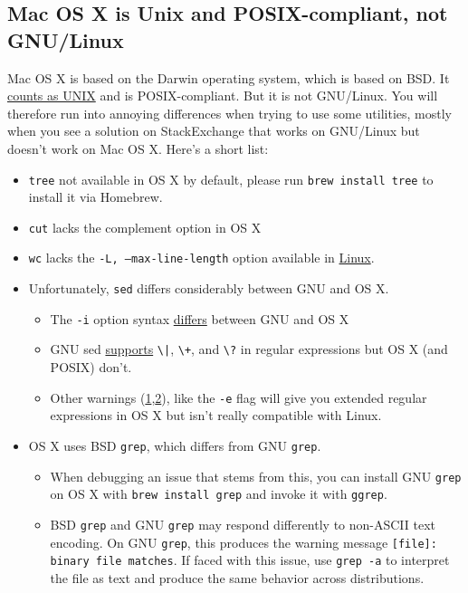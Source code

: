 \subsection{Mac OS X is Unix and POSIX-compliant, not GNU/Linux}

Mac OS X is based on the Darwin operating system, which is based on BSD.
It \href{https://www.opengroup.org/openbrand/register/apple.htm}{counts as UNIX} and is POSIX-compliant.
But it is not GNU/Linux.
You will therefore run into annoying differences when trying to use some utilities, mostly when you see a solution on StackExchange that works on GNU/Linux but doesn't work on Mac OS X.
Here's a short list:
\begin{itemize}
\item \texttt{tree} not available in OS X by default, please run \texttt{brew install tree} to install it via Homebrew.
\item \texttt{cut} lacks the complement option in OS X
\item \texttt{wc} lacks the \texttt{-L, --max-line-length} option available in \href{https://linux.die.net/man/1/wc}{Linux}.
\item Unfortunately, \texttt{sed} differs considerably between GNU and OS X.
\begin{itemize}
	\item The \texttt{-i} option syntax \href{https://stackoverflow.com/questions/2320564/i-need-my-sed-i-command-for-in-place-editing-to-work-with-both-gnu-sed-and-bsd}{differs} between GNU and OS X
	\item GNU sed \href{https://unix.stackexchange.com/questions/13711/differences-between-sed-on-mac-osx-and-other-standard-sed}{supports} \texttt{\textbackslash|}, \texttt{\textbackslash+}, and \texttt{\textbackslash?} in regular expressions but OS X (and POSIX) don't.
	\item Other warnings (\href{https://unix.stackexchange.com/a/131940}{1},\href{https://stackoverflow.com/questions/1227174/sed-on-os-x-cant-seem-to-use-in-regexps}{2}), like the \texttt{-e} flag will give you extended regular expressions in OS X but isn't really compatible with Linux.
\end{itemize}

\item OS X uses BSD \texttt{grep}, which differs from GNU \texttt{grep}. 
\begin{itemize}
    \item When debugging an issue that stems from this, you can install GNU
        \texttt{grep} on OS X with \texttt{brew install grep} and invoke it with \texttt{ggrep}.
    \item BSD \texttt{grep} and GNU \texttt{grep} may respond differently to non-ASCII text encoding.
        On GNU \texttt{grep}, this produces the warning message \texttt{[file]: binary file matches}.
        If faced with this issue, use \texttt{grep -a} to interpret the file as text
        and produce the same behavior across distributions.
\end{itemize}

\end{itemize}


